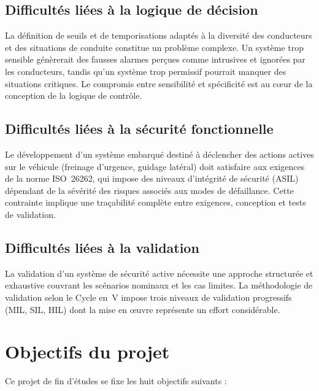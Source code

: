 \documentclass[12pt,a4paper]{report}
\begin{document}
\subsection{Difficult\'es li\'ees \`a la logique de d\'ecision}

La d\'efinition de seuils et de temporisations adapt\'es \`a la diversit\'e des conducteurs et des situations de conduite constitue un probl\`eme complexe. Un syst\`eme trop sensible g\'en\`ererait des fausses alarmes per\c{c}ues comme intrusives et ignor\'ees par les conducteurs, tandis qu'un syst\`eme trop permissif pourrait manquer des situations critiques. Le compromis entre sensibilit\'e et sp\'ecificit\'e est au c\oe ur de la conception de la logique de contr\^ole.

\subsection{Difficult\'es li\'ees \`a la s\'ecurit\'e fonctionnelle}

Le d\'eveloppement d'un syst\`eme embarqu\'e destin\'e \`a d\'eclencher des actions actives sur le v\'ehicule (freinage d'urgence, guidage lat\'eral) doit satisfaire aux exigences de la norme ISO~26262, qui impose des niveaux d'int\'egrit\'e de s\'ecurit\'e (ASIL) d\'ependant de la s\'ev\'erit\'e des risques associ\'es aux modes de d\'efaillance. Cette contrainte implique une traçabilit\'e compl\`ete entre exigences, conception et tests de validation.

\subsection{Difficult\'es li\'ees \`a la validation}

La validation d'un syst\`eme de s\'ecurit\'e active n\'ecessite une approche structur\'ee et exhaustive couvrant les sc\'enarios nominaux et les cas limites. La m\'ethodologie de validation selon le Cycle en~V impose trois niveaux de validation progressifs (MIL, SIL, HIL) dont la mise en \oe uvre repr\'esente un effort consid\'erable.

\section{Objectifs du projet}

Ce projet de fin d'\'etudes se fixe les huit objectifs suivants :
\end{document}
